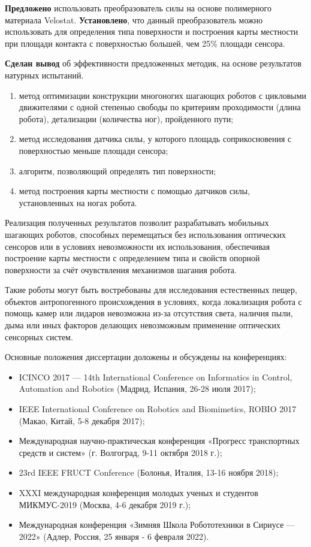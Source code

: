 \textbf{Предложено} использовать преобразователь силы на основе полимерного материала Velostat. \textbf{Установлено}, что данный преобразователь можно использовать для определения типа поверхности и построения карты местности при площади контакта с поверхностью большей, чем 25\% площади сенсора. 

\textbf{Сделан вывод} об эффективности предложенных методик, на основе результатов натурных испытаний.

{}
\begin{enumerate}[beginpenalty=10000] %
  \item метод оптимизации конструкции многоногих шагающих роботов с цикловыми движителями с одной степенью свободы по критериям проходимости (длина робота), детализации (количества ног), пройденного пути;
  \item метод исследования датчика силы, у которого площадь соприкосновения с поверхностью меньше площади сенсора;
  \item алгоритм, позволяющий определять тип поверхности;
  \item метод построения карты местности с помощью датчиков силы, установленных на ногах робота.
\end{enumerate}


{\influence} Реализация полученных результатов позволит разрабатывать мобильных шагающих роботов, способных перемещаться без использования оптических сенсоров или в условиях невозможности их использования, обеспечивая построение карты местности с определением типа и свойств опорной поверхности за счёт очувствления механизмов шагания робота. 

Такие роботы могут быть востребованы для исследования естественных пещер, объектов антропогенного происхождения в условиях, когда локализация робота с помощь камер или лидаров невозможна из-за отсутствия света, наличия пыли, дыма или иных факторов делающих невозможным применение оптических сенсорных систем.


{\probation}
Основные положения диссертации доложены и обсуждены на конференциях:
\begin{itemize}
  \item ICINCO 2017 — 14th International Conference on Informatics in Control, Automation and Robotics (Мадрид, Испания, 26-28 июля 2017);
  \item IEEE International Conference on Robotics and Biomimetics, ROBIO 2017 (Макао, Китай, 5-8 декабря 2017);
  \item  Международная научно-практическая конференция «Прогресс транспортных средств и систем» (г. Волгоград, 9-11 октября 2018 г.);
  \item 23rd IEEE FRUCT Conference (Болонья, Италия, 13-16 ноября 2018);
  \item XXXI международная конференция молодых ученых и студентов МИКМУС-2019 (Москва, 4-6 декабря 2019 г.);
  \item Международная конференция «Зимняя Школа Робототехники в Сириусе — 2022» (Адлер, Россия, 25 января - 6 февраля 2022).
\end{itemize}

